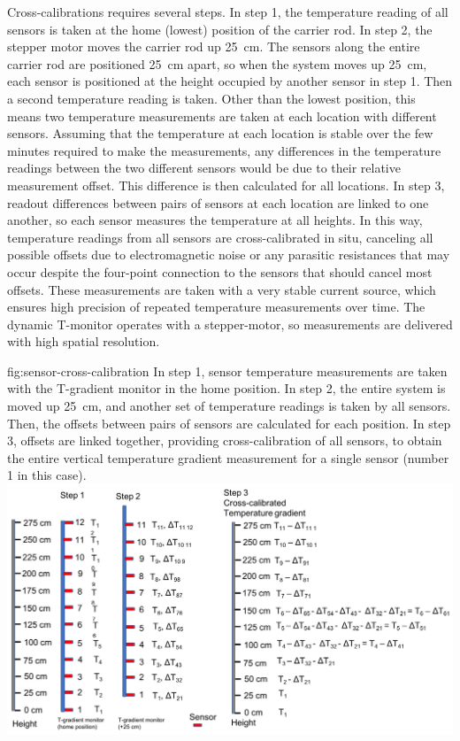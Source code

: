 Cross-calibrations requires several steps. In step 1, the temperature reading  of all sensors is taken at the home (lowest) position of the carrier rod. In  step 2, the stepper motor moves the carrier rod up \SI{25}{cm}. The sensors along the entire  carrier rod are positioned \SI{25}{cm} apart, so when the system moves up \SI{25}{cm}, each sensor is positioned at the height occupied by another sensor in step 1. Then a second temperature reading is taken. Other than the lowest position, this means two temperature measurements are taken at each location with %
different sensors. Assuming that the temperature at each location is stable over the few minutes required to make the measurements, %
any differences in the temperature readings between the two different sensors would be due to their relative measurement offset. This %
difference is then calculated for all locations.  In step 3, readout differences between pairs of sensors at each location are linked to one another, so each sensor measures the temperature at all heights. In this way, temperature readings from all sensors are cross-calibrated %
in situ, canceling all possible offsets due to electromagnetic noise or any parasitic resistances that may occur despite the four-point connection to the sensors that should cancel most offsets. These measurements are taken with a very stable current source, which ensures high precision of repeated temperature measurements over time. The dynamic T-monitor operates with a stepper-motor, so measurements are delivered with high spatial resolution. 

\begin{dunefigure}{fig:sensor-cross-calibration}
  {In step 1, sensor temperature measurements are taken with the T-gradient monitor in the home position. In step 2, the entire system is moved up \SI{25}{cm}, and another set of temperature readings is taken by all sensors. Then, the offsets between pairs of sensors are calculated for each position. In step 3, offsets are linked together, providing cross-calibration of all sensors, to obtain the entire vertical temperature gradient measurement for a single sensor (number 1 in this case). }
  \includegraphics[width=1.0\textwidth]{graphics/cisc_cross_calibration_illustration.png}%
\end{dunefigure}


